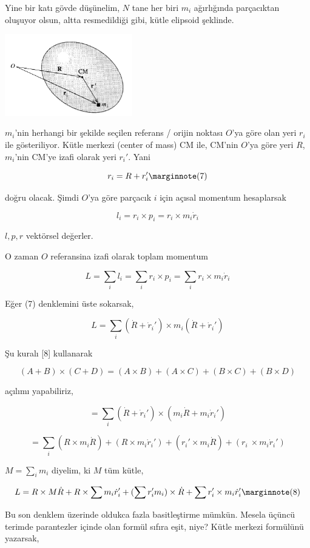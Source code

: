 \documentclass[12pt,fleqn]{article}\usepackage{../../common}
\begin{document}
Yine bir katı gövde düşünelim, $N$ tane her biri $m_i$ ağırlığında parçacıktan
oluşuyor olsun, altta resmedildiği gibi, kütle elipsoid şeklinde.

\includegraphics[width=15em]{phy_005_basics_09.png}

$m_i$'nin herhangi bir şekilde seçilen referans / orijin noktası $O$'ya göre
olan yeri $r_i$ ile gösteriliyor. Kütle merkezi (center of mass) CM ile,
CM'nin $O$'ya göre yeri $R$, $m_i$'nin CM'ye izafi olarak yeri $r_i'$. Yani

$$
r_i = R + r_i'
\mlabel{7}
$$

doğru olacak. Şimdi $O$'ya göre parçacık $i$ için açısal momentum hesaplarsak

$$
l_i = r_i \times p_i = r_i \times m_i \dot{r}_i
$$

$l,p,r$ vektörsel değerler.

O zaman $O$ referansina izafi olarak toplam momentum

$$
L = \sum_i l_i = \sum_i r_i \times p_i = \sum_i r_i \times m_i \dot{r}_i
$$

Eğer (7) denklemini üste sokarsak,

$$
L = \sum_i (\dot{R} + \dot{r}_i') \times m_i (\dot{R} + \dot{r}_i' )
$$

Şu kuralı [8] kullanarak

$$
(A + B) \times (C+D) = (A \times B) + (A \times C) + (B \times C) + (B \times D) 
$$

açılımı yapabiliriz, 

$$
 = \sum_i (\dot{R} + \dot{r}_i') \times (m_i \dot{R} + m_i \dot{r}_i' )
$$


$$
= \sum_i (R \times m_i \dot{R}) +
  (R \times m_i \dot{r}_i') +
  (r_i' \times m_i \dot{R}) +
  (r_i\ \times m_i \dot{r}_i')   
$$

$M = \sum_i m_i $ diyelim, ki $M$ tüm kütle,

$$
L = R \times M\dot{R} +
R \times \sum m_i \dot{r}_i' +
(\sum r_i' m_i) \times \dot{R} +
\sum r_i' \times m_i \dot{r}_i'
\mlabel{8}
$$

Bu son denklem üzerinde oldukca fazla basitleştirme mümkün. Mesela üçüncü
terimde parantezler içinde olan formül sıfıra eşit, niye? Kütle merkezi
formülünü yazarsak,
\end{document}
